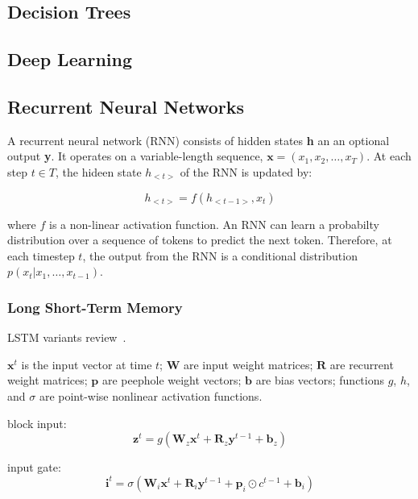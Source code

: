\subsection{Decision Trees}

\subsection{Deep Learning}

\subsection{Recurrent Neural Networks}

A recurrent neural network (RNN) consists of hidden states \textbf{h} an an optional output \textbf{y}. It operates on a variable-length sequence, $\bm{x} = \left( x_1, x_2, \ldots, x_T \right)$. At each step $t \in T$, the hideen state $h_{<t>}$ of the RNN is updated by:

\[ h_{<t>} = f\left( h_{<t-1>}, x_t \right) \]

where $f$ is a non-linear activation function. An RNN can learn a probabilty distribution over a sequence of tokens to predict the next token. Therefore, at each timestep $t$, the output from the RNN is a conditional distribution $p\left( x_t | x_1, \ldots, x_{t-1} \right)$.


\subsubsection{Long Short-Term Memory}

LSTM variants review~\cite{Greff2015}.

$\bm{x}^t$ is the input vector at time $t$; $\bm{W}$ are input weight matrices; $\bm{R}$ are recurrent weight matrices; $\bm{p}$ are peephole weight vectors; $\bm{b}$ are bias vectors; functions $g$, $h$, and $\sigma$ are point-wise nonlinear activation functions.

block input:
\[ \bm{z}^{t} = g \left( \bm{W}_z \bm{x}^t + \bm{R}_z \bm{y}^{t - 1} + \bm{b}_z \right) \]

input gate:
\[ \bm{i}^{t} = \sigma \left( \bm{W}_i \bm{x}^t + \bm{R}_i \bm{y}^{t-1} + \bm{p}_i \odot c^{t-1} + \bm{b}_i \right) \]

